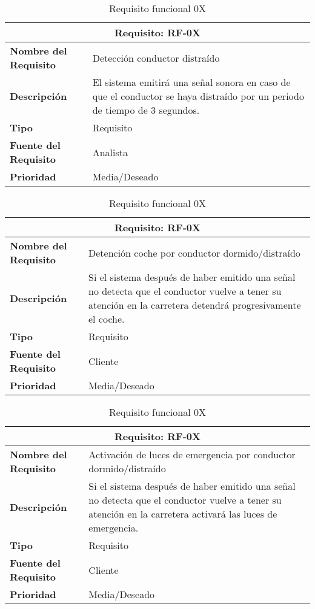 \documentclass[10pt,a4paper,oldfontcommands]{dpds}
\begin{document}
\begin{table}[H]
\begin{center}
\begin{tabular}{p{} p{7cm}}
\multicolumn{2}{c}{\textbf{Requisito: RF-0X} } \\
\hline \hline
\textbf{Nombre del Requisito} & Detección conductor distraído\\
\textbf{Descripción} & El sistema emitirá una señal sonora en caso de que el conductor se haya distraído por un periodo de tiempo de 3 segundos.\\
\textbf{Tipo} & Requisito  \\
\textbf{Fuente del Requisito} & Analista  \\
\textbf{Prioridad} & Media/Deseado  \\ \hline
\end{tabular}
\caption{Requisito funcional 0X}
\label{tab:personal}
\end{center}
\end{table}

\begin{table}[H]
\begin{center}
\begin{tabular}{p{} p{7cm}}
\multicolumn{2}{c}{\textbf{Requisito: RF-0X} } \\
\hline \hline
\textbf{Nombre del Requisito} & Detención  coche por conductor dormido/distraído\\
\textbf{Descripción} &Si el sistema después de haber emitido una señal no detecta que el conductor vuelve a tener su atención en la carretera detendrá progresivamente el coche.\\
\textbf{Tipo} & Requisito  \\
\textbf{Fuente del Requisito} & Cliente  \\
\textbf{Prioridad} & Media/Deseado  \\ \hline
\end{tabular}
\caption{Requisito funcional 0X}
\label{tab:personal}
\end{center}
\end{table}

\begin{table}[H]
\begin{center}
\begin{tabular}{p{} p{7cm}}
\multicolumn{2}{c}{\textbf{Requisito: RF-0X} } \\
\hline \hline
\textbf{Nombre del Requisito} & Activación de luces de emergencia por conductor dormido/distraído\\
\textbf{Descripción} &Si el sistema después de haber emitido una señal no detecta que el conductor vuelve a tener su atención en la carretera activará las luces de emergencia.\\
\textbf{Tipo} & Requisito  \\
\textbf{Fuente del Requisito} & Cliente  \\
\textbf{Prioridad} & Media/Deseado  \\ \hline
\end{tabular}
\caption{Requisito funcional 0X}
\label{tab:personal}
\end{center}
\end{table}
\end{document}
